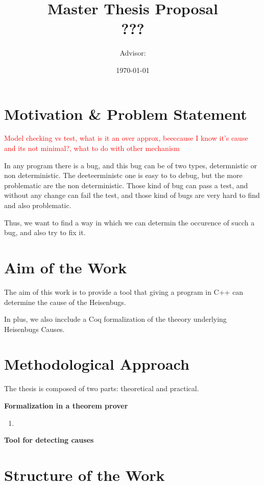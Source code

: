 \documentclass[12pt, a4paper]{article}
\title{
    \textbf{Master Thesis Proposal}\\
    ???
}
\author{Advisor: }
\date{\today}
\newcommand{\textrosu}[1]{\textcolor{red}{#1}}
\begin{document}
\maketitle
\tableofcontents
\newpage

\section{Motivation \& Problem Statement}

\textrosu{Model checking vs test, what is it an over approx, beeccause I know it's cause and its not minimal?, what to do with other mechanism}

In any program there is a bug, and this bug can be of two types, determnistic or non deterministic. The deeteerministc one is easy to to debug, but the more problematic are the non deterministic. Those kind of bug can pass a test, and without any change can fail the test, and those kind of bugs are very hard to find and also problematic. \cite{mainart}

Thus, we want to find a way in which we can determin the occurence of succh a bug, and also try to fix it.

\newpage

\section{Aim of the Work}

The aim of this work is to provide a tool that giving a program in C++ can determine the cause of the Heisenbugs.

In plus, we also incclude a Coq formalization of the theeory underlying Heisenbugs Causes.

\newpage

\section{Methodological Approach}
The thesis is composed of two parts: theoretical and practical.

\textbf{Formalization in a theorem prover}

\begin{enumerate}
    \item 
\end{enumerate}

\textbf{Tool for detecting causes}

\newpage

\section{Structure of the Work}
\end{document}
